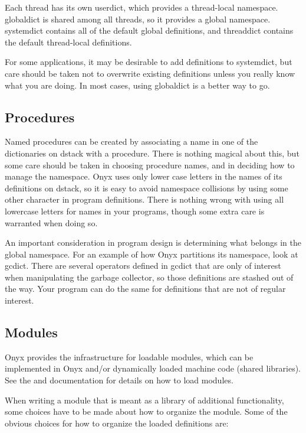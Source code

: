 Each thread has its own userdict, which provides a thread-local namespace.
globaldict is shared among all threads, so it provides a global namespace.
systemdict contains all of the default global definitions, and threaddict
contains the default thread-local definitions.

For some applications, it may be desirable to add definitions to systemdict, but
care should be taken not to overwrite existing definitions unless you really
know what you are doing.  In most cases, using globaldict is a better way to
go.

\subsection{Procedures}

Named procedures can be created by associating a name in one of the dictionaries
on dstack with a procedure.  There is nothing magical about this, but some care
should be taken in choosing procedure names, and in deciding how to manage the
namespace.  Onyx uses only lower case letters in the names of its definitions on
dstack, so it is easy to avoid namespace collisions by using some other
character in program definitions.  There is nothing wrong with using all
lowercase letters for names in your programs, though some extra care is
warranted when doing so.

An important consideration in program design is determining what belongs in the
global namespace.  For an example of how Onyx partitions its namespace, look at
gcdict.  There are several operators defined in gcdict that are only of interest
when manipulating the garbage collector, so those definitions are stashed out of
the way.  Your program can do the same for definitions that are not of regular
interest.

\subsection{Modules}
Onyx provides the infrastructure for loadable modules, which can be implemented
in Onyx and/or dynamically loaded machine code (shared libraries).  See the
 and
 documentation for details
on how to load modules.

When writing a module that is meant as a library of additional functionality,
some choices have to be made about how to organize the module.  Some of the
obvious choices for how to organize the loaded definitions are:

